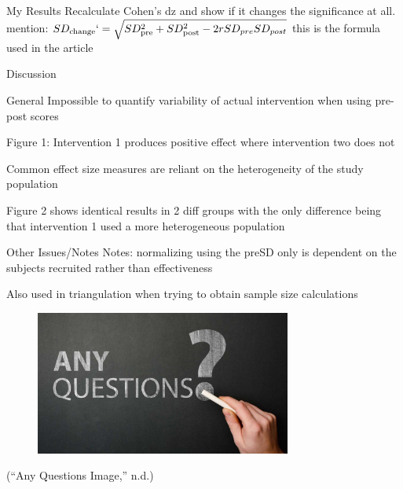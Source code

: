 \documentclass[
  ignorenonframetext,
  aspectratio=169,
]{beamer}
\begin{document}
\begin{frame}{My Results}
\protect\hypertarget{my-results}{}
Recalculate Cohen's dz and show if it changes the significance at all.
mention:
\(SD_\text{change}`=\sqrt{SD_{\text{pre}}^2+SD_{\text{post}}^2-2rSD_{pre}SD_{post}}\)
this is the formula used in the article
\end{frame}

\begin{frame}{Discussion}
\protect\hypertarget{discussion}{}
\begin{block}{General}
\protect\hypertarget{general}{}
Impossible to quantify variability of actual intervention when using
pre-post scores

Figure 1: Intervention 1 produces positive effect where intervention two
does not

Common effect size measures are reliant on the heterogeneity of the
study population

Figure 2 shows identical results in 2 diff groups with the only
difference being that intervention 1 used a more heterogeneous
population
\end{block}

\begin{block}{Other Issues/Notes}
\protect\hypertarget{other-issuesnotes}{}
Notes: normalizing using the preSD only is dependent on the subjects
recruited rather than effectiveness

Also used in triangulation when trying to obtain sample size
calculations
\end{block}
\end{frame}

\begin{frame}{}
\protect\hypertarget{section}{}
\begin{figure}
\centering
\includegraphics[width=0.75\textwidth]{any-questions.jpeg}
\end{figure}

({``Any Questions Image,''} n.d.)
\end{frame}
\end{document}
